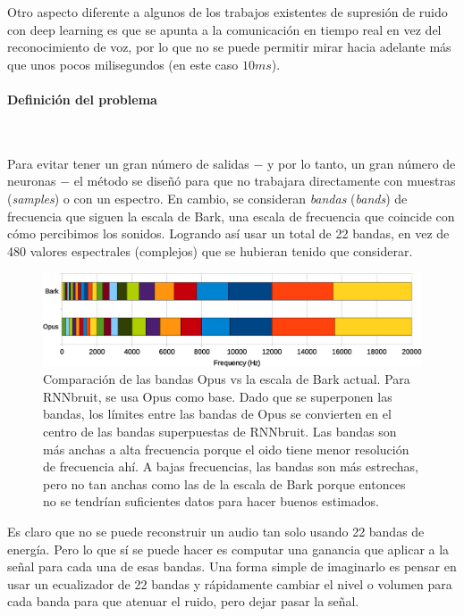 \documentclass[conference,onecolumn]{IEEEtran}
\begin{document}
Otro aspecto diferente a algunos de los trabajos existentes de supresión de ruido con deep learning es que se apunta a la comunicación en tiempo real en vez del reconocimiento de voz, por lo que no se puede permitir mirar hacia adelante más que unos pocos milisegundos (en este caso $10 ms$).
\medskip

\paragraph{\textbf{Definición del problema}}
\hfill\\
\hfill

Para evitar tener un gran número de salidas $-$ y por lo tanto, un gran número de neuronas $-$ el método se diseñó para que no trabajara directamente con muestras (\textit{samples}) o con un espectro. En cambio, se consideran \textit{bandas} (\textit{bands}) de frecuencia que siguen la escala de Bark, una escala de frecuencia que coincide con cómo percibimos los sonidos. Logrando así usar un total de 22 bandas, en vez de 480 valores espectrales (complejos) que se hubieran tenido que considerar.

 \begin{figure}[H]
 \centering
    \includegraphics[scale=0.25]{bands.png}
    \caption{Comparación de las bandas Opus vs la escala de Bark actual. Para RNNbruit, se usa Opus como base. Dado que se superponen las bandas, los límites entre las bandas de Opus se convierten en el centro de las bandas superpuestas de RNNbruit. Las bandas son más anchas a alta frecuencia porque el oido tiene menor resolución de frecuencia ahí. A bajas frecuencias, las bandas son más estrechas, pero no tan anchas como las de la escala de Bark porque entonces no se tendrían suficientes datos para hacer buenos estimados.} 
\end{figure}

Es claro que no se puede reconstruir un audio tan solo usando 22 bandas de energía. Pero lo que sí se puede hacer es computar una ganancia que aplicar a la señal para cada una de esas bandas. Una forma simple de imaginarlo es pensar en usar un ecualizador de 22 bandas y rápidamente cambiar el nivel o volumen para cada banda para que atenuar el ruido, pero dejar pasar la señal.
\end{document}
